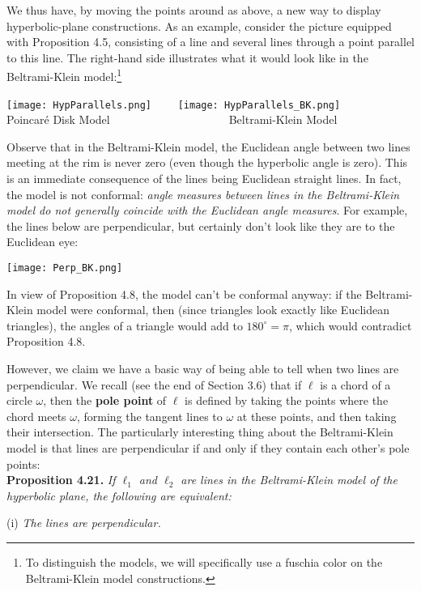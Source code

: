 \documentclass[leqno]{book}
\begin{document}
\noindent We thus have, by moving the points around as above, a new way to display hyperbolic-plane constructions.  As an example, consider the picture equipped with Proposition 4.5, consisting of a line and several lines through a point parallel to this line.  The right-hand side illustrates what it would look like in the Beltrami-Klein model:\footnote{To distinguish the models, we will specifically use a fuschia color on the Beltrami-Klein model constructions.}
\begin{center}
\texttt{[image: HypParallels.png]}~~~~
\texttt{[image: HypParallels\_BK.png]}\\
Poincar\'e Disk Model~~~~~~~~~~~~~~~~~~~~~Beltrami-Klein Model
\end{center}

Observe that in the Beltrami-Klein model, the Euclidean angle between two lines meeting at the rim is never zero (even though the hyperbolic angle is zero).  This is an immediate consequence of the lines being Euclidean straight lines.  In fact, the model is not conformal: \emph{angle measures between lines in the Beltrami-Klein model do not generally coincide with the Euclidean angle measures}.  For example, the lines below are perpendicular, but certainly don't look like they are to the Euclidean eye:
\begin{center}
\texttt{[image: Perp\_BK.png]}
\end{center}
In view of Proposition 4.8, the model can't be conformal anyway: if the Beltrami-Klein model were conformal, then (since triangles look exactly like Euclidean triangles), the angles of a triangle would add to $180^\circ=\pi$, which would contradict Proposition 4.8.

However, we claim we have a basic way of being able to tell when two lines are perpendicular.  We recall (see the end of Section 3.6) that if $\ell$ is a chord of a circle $\omega$, then the \textbf{pole point} of $\ell$ is defined by taking the points where the chord meets $\omega$, forming the tangent lines to $\omega$ at these points, and then taking their intersection.  The particularly interesting thing about the Beltrami-Klein model is that lines are perpendicular if and only if they contain each other's pole points:\\

\noindent\textbf{Proposition 4.21.} \emph{If $\ell_1$ and $\ell_2$ are lines in the Beltrami-Klein model of the hyperbolic plane, the following are equivalent:}

(i) \emph{The lines are perpendicular.}
\end{document}
